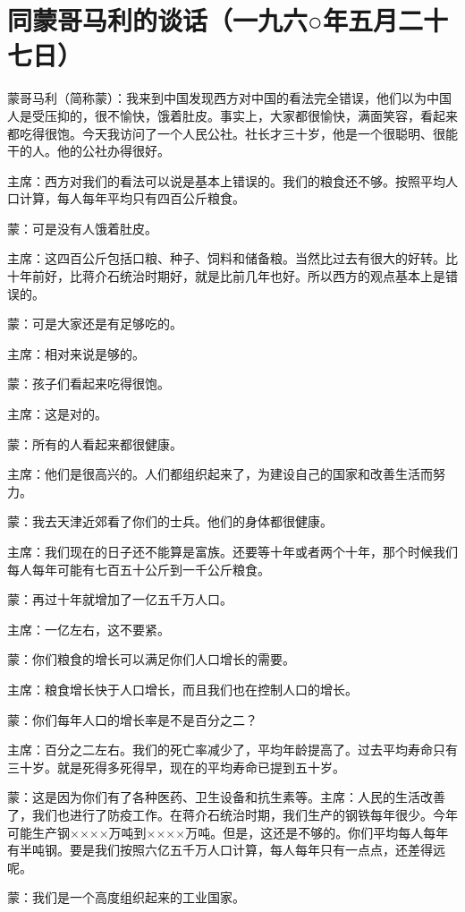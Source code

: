 \section[同蒙哥马利的谈话（一九六○年五月二十七日）]{同蒙哥马利的谈话（一九六○年五月二十七日）}


蒙哥马利（简称蒙）：我来到中国发现西方对中国的看法完全错误，他们以为中国人是受压抑的，很不愉快，饿着肚皮。事实上，大家都很愉快，满面笑容，看起来都吃得很饱。今天我访问了一个人民公社。社长才三十岁，他是一个很聪明、很能干的人。他的公社办得很好。

主席：西方对我们的看法可以说是基本上错误的。我们的粮食还不够。按照平均人口计算，每人每年平均只有四百公斤粮食。

蒙：可是没有人饿着肚皮。

主席：这四百公斤包括口粮、种子、饲料和储备粮。当然比过去有很大的好转。比十年前好，比蒋介石统治时期好，就是比前几年也好。所以西方的观点基本上是错误的。

蒙：可是大家还是有足够吃的。

主席：相对来说是够的。

蒙：孩子们看起来吃得很饱。

主席：这是对的。

蒙：所有的人看起来都很健康。

主席：他们是很高兴的。人们都组织起来了，为建设自己的国家和改善生活而努力。

蒙：我去天津近郊看了你们的士兵。他们的身体都很健康。

主席：我们现在的日子还不能算是富族。还要等十年或者两个十年，那个时候我们每人每年可能有七百五十公斤到一千公斤粮食。

蒙：再过十年就增加了一亿五千万人口。

主席：一亿左右，这不要紧。

蒙：你们粮食的增长可以满足你们人口增长的需要。

主席：粮食增长快于人口增长，而且我们也在控制人口的增长。

蒙：你们每年人口的增长率是不是百分之二？

主席：百分之二左右。我们的死亡率减少了，平均年龄提高了。过去平均寿命只有三十岁。就是死得多死得早，现在的平均寿命已提到五十岁。

蒙：这是因为你们有了各种医药、卫生设备和抗生素等。主席：人民的生活改善了，我们也进行了防疫工作。在蒋介石统治时期，我们生产的钢铁每年很少。今年可能生产钢××××万吨到××××万吨。但是，这还是不够的。你们平均每人每年有半吨钢。要是我们按照六亿五千万人口计算，每人每年只有一点点，还差得远呢。

蒙：我们是一个高度组织起来的工业国家。

